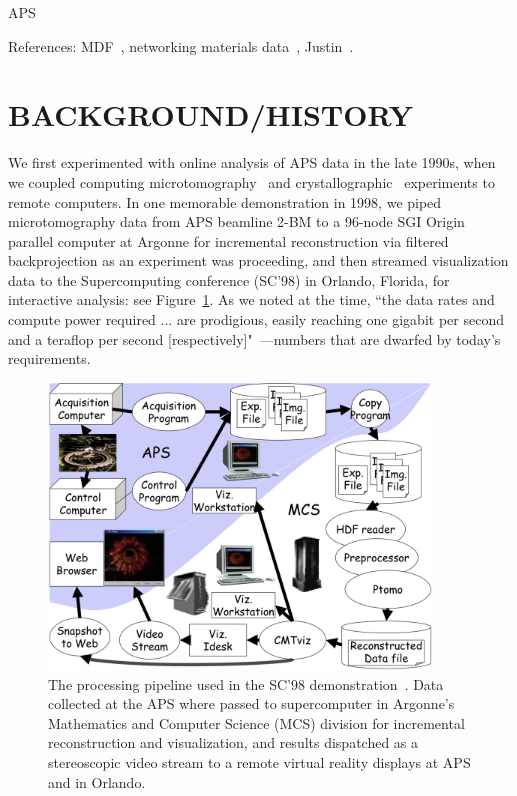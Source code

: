 \documentclass{aip-cp}
\begin{document}
APS~\cite{toby2015practices}

References: MDF~\cite{MDF2016}, networking materials data~\cite{foster2015networking}, Justin~\cite{wozniak2015big}.

\section{BACKGROUND/HISTORY}

We first experimented with online analysis of APS data in the late 1990s, 
when we coupled 
computing microtomography~\cite{wang1999quasi,wang2001high} and crystallographic~\cite{von2000using}
experiments to remote computers.
In one memorable demonstration in 1998, we piped microtomography data from APS beamline 2-BM to a 
96-node SGI Origin parallel computer 
at Argonne for incremental reconstruction via filtered backprojection as an experiment was 
proceeding,
and then streamed visualization data to the Supercomputing conference (SC'98) in Orlando, Florida, 
for interactive analysis: see Figure~\ref{fig:sc98}. 
As we noted at the time, 
``the data rates and compute power required ... are prodigious, easily reaching one gigabit per 
second and a teraflop per second [respectively]"~\cite{von2000real}---numbers that are dwarfed by 
today's requirements. 

\begin{figure}[h]
  \centerline{\includegraphics[width=4in]{Figs/APS-Fig.png}}
  \caption{The processing pipeline used in the SC'98 demonstration~\cite{von2000real}. Data 
collected at the APS 
  where passed to supercomputer in Argonne's Mathematics and Computer Science (MCS) division for
  incremental reconstruction and visualization, and results dispatched as a stereoscopic
  video stream to a remote virtual reality displays at APS and in Orlando.\label{fig:sc98}}
\end{figure}
\end{document}
